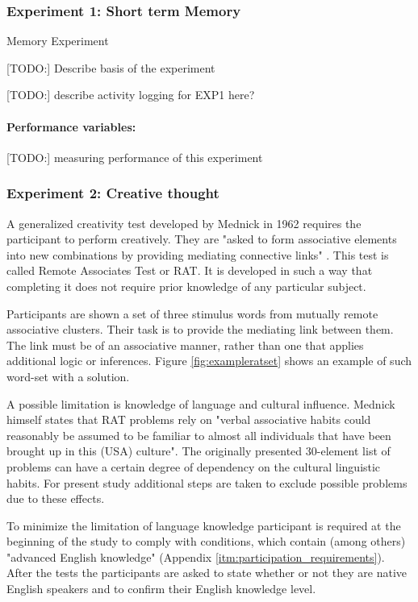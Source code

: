 		\subsubsection{Experiment 1: Short term Memory} \label{sec:memory}
		
		Memory Experiment 
		
		[TODO:] Describe basis of the experiment
		
		[TODO:] describe activity logging for EXP1 here?
		
		\paragraph{Performance variables:} \label{sec:memory-parameters}
		
		[TODO:] measuring performance of this experiment
		
		\subsubsection{Experiment 2: Creative thought} \label{sec:creativity}
		
		A generalized creativity test developed by Mednick \cite{Mednick1962} in 1962 requires the participant to perform creatively. They are "asked to form associative elements into new combinations by providing mediating connective links" \cite[p. 226]{Mednick1962}. This test is called Remote Associates Test or RAT.
		It is developed in such a way that completing it does not require prior knowledge of any particular subject. 
		
		Participants are shown a set of three stimulus words from mutually remote associative clusters. Their task is to provide the mediating link between them. The link must be of an associative manner, rather than one that applies additional logic or inferences. Figure \ref{fig:exampleratset} shows an example of such word-set with a solution.
		
		A possible limitation is knowledge of language and cultural influence. Mednick himself states that RAT problems rely on "verbal associative habits could reasonably be assumed to be familiar to almost all individuals that have been brought up in this (USA) culture". The originally presented 30-element list of problems can have a certain degree of dependency on the cultural linguistic habits. For present study additional steps are taken to exclude possible problems due to these effects. 
		
		To minimize the limitation of language knowledge participant is required at the beginning of the study to comply with conditions, which contain (among others) "advanced English knowledge" (Appendix \ref{itm:participation_requirements}). After the tests the participants are asked to state whether or not they are native English speakers and to confirm their English knowledge level.
		
